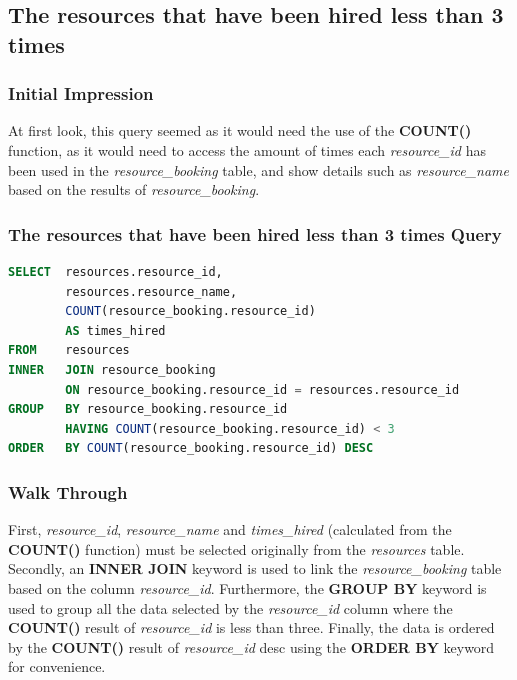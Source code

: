 \documentclass{article}
\begin{document}
\subsection{The resources that have been hired less than 3 times}
\subsubsection{Initial Impression} At first look, this query seemed as it would need the use of the \textbf{COUNT()} function, as it would need to access the amount of times each \textit{resource\_id} has been used in the \textit{resource\_booking} table, and show details such as \textit{resource\_name} based on the results of \textit{resource\_booking}. 

\subsubsection{The resources that have been hired less than 3 times Query}
\begin{lstlisting}[language=sql, caption=The resources that have been hired less than 3 times Query, style=mystyle]
SELECT  resources.resource_id, 
        resources.resource_name, 
        COUNT(resource_booking.resource_id) 
        AS times_hired 
FROM    resources
INNER   JOIN resource_booking 
        ON resource_booking.resource_id = resources.resource_id
GROUP   BY resource_booking.resource_id 
        HAVING COUNT(resource_booking.resource_id) < 3
ORDER   BY COUNT(resource_booking.resource_id) DESC
\end{lstlisting} 

\subsubsection{Walk Through} First, \textit{resource\_id}, \textit{resource\_name} and \textit{times\_hired} (calculated from the \textbf{COUNT()} function) must be selected originally from the \textit{resources} table.
\\\newline
Secondly, an \textbf{INNER JOIN} keyword is used to link the \textit{resource\_booking} table based on the column \textit{resource\_id}. Furthermore, the \textbf{GROUP BY} keyword is used to group all the data selected by the \textit{resource\_id} column where the \textbf{COUNT()} result of \textit{resource\_id} is less than three. Finally, the data is ordered by the \textbf{COUNT()} result of \textit{resource\_id} \acrshort{desc} using the \textbf{ORDER BY} keyword for convenience.
\end{document}
